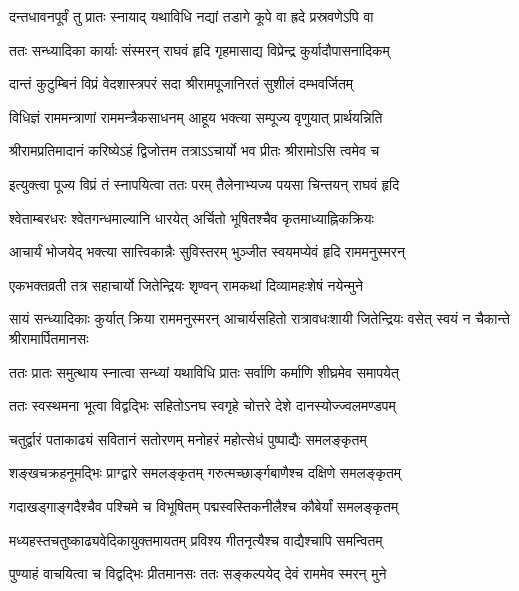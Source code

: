 \twolineshloka
{दन्तधावनपूर्वं तु प्रातः स्नायाद् यथाविधि}
{नद्यां तडागे कूपे वा ह्रदे प्रस्रवणेऽपि वा}%

\twolineshloka
{ततः सन्ध्यादिका कार्याः संस्मरन् राघवं हृदि}
{गृहमासाद्य विप्रेन्द्र कुर्यादौपासनादिकम्}%

\twolineshloka
{दान्तं कुटुम्बिनं विप्रं वेदशास्त्रपरं सदा}
{श्रीरामपूजानिरतं सुशीलं दम्भवर्जितम्}%

\twolineshloka
{विधिज्ञं राममन्त्राणां राममन्त्रैकसाधनम्}
{आहूय भक्त्या सम्पूज्य वृणुयात् प्रार्थयन्निति}%

\twolineshloka
{श्रीरामप्रतिमादानं करिष्येऽहं द्विजोत्तम}
{तत्राऽऽचार्यो भव प्रीतः श्रीरामोऽसि त्वमेव च}%

\twolineshloka
{इत्युक्त्वा पूज्य विप्रं तं स्नापयित्वा ततः परम्}
{तैलेनाभ्यज्य पयसा चिन्तयन् राघवं हृदि}%

\twolineshloka
{श्वेताम्बरधरः श्वेतगन्धमाल्यानि धारयेत्}
{अर्चितो भूषितश्चैव कृतमाध्याह्निकक्रियः}%

\twolineshloka
{आचार्यं भोजयेद् भक्त्या सात्त्विकान्नैः सुविस्तरम्}
{भुञ्जीत स्वयमप्येवं हृदि राममनुस्मरन्}%

\twolineshloka
{एकभक्तव्रती तत्र सहाचार्यो जितेन्द्रियः}
{शृण्वन् रामकथां दिव्यामहःशेषं नयेन्मुने}%

\threelineshloka
{सायं सन्ध्यादिकाः कुर्यात् क्रिया राममनुस्मरन्}
{आचार्यसहितो रात्रावधःशायी जितेन्द्रियः}%
{वसेत् स्वयं न चैकान्ते श्रीरामार्पितमानसः}

\twolineshloka
{ततः प्रातः समुत्थाय स्नात्वा सन्ध्यां यथाविधि}%
{प्रातः सर्वाणि कर्माणि शीघ्रमेव समापयेत्}

\twolineshloka
{ततः स्वस्थमना भूत्वा विद्वद्भिः सहितोऽनघ}%
{स्वगृहे चोत्तरे देशे दानस्योज्ज्वलमण्डपम्}%

\twolineshloka
{चतुर्द्वारं पताकाढ्यं सवितानं सतोरणम्}%
{मनोहरं महोत्सेधं पुष्पाद्यैः समलङ्कृतम्}

\twolineshloka
{शङ्खचक्रहनूमद्भिः प्राग्द्वारे समलङ्कृतम्}%
{गरुत्मच्छार्ङ्गबाणैश्च दक्षिणे समलङ्कृतम्}

\twolineshloka
{गदाखड्गाङ्गदैश्चैव पश्चिमे च विभूषितम्}%
{पद्मस्वस्तिकनीलैश्च कौबेर्यां समलङ्कृतम्}

\twolineshloka
{मध्यहस्तचतुष्काढ्यवेदिकायुक्तमायतम्}%
{प्रविश्य गीतनृत्यैश्च वाद्यैश्चापि समन्वितम्}

\twolineshloka
{पुण्याहं वाचयित्वा च विद्वद्भिः प्रीतमानसः}%
{ततः सङ्कल्पयेद् देवं राममेव स्मरन् मुने}

